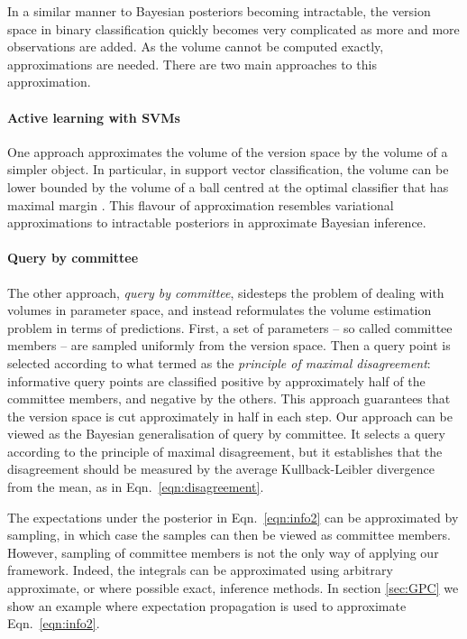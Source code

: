 \documentclass[twoside]{article}
\begin{document}
In a similar manner to Bayesian posteriors becoming intractable, the version space in
binary classification quickly becomes very complicated as more and more
observations are added. As the volume cannot be computed exactly,
approximations are needed. There are two main approaches to this approximation.

\paragraph{Active learning with SVMs} One approach \cite{TongKoller2001} approximates the volume of the version space
by the volume of a simpler object. In particular, in support vector
classification, the volume can be lower bounded by the volume of a ball
centred at the optimal classifier that has maximal margin
\cite{TongKoller2001}. This flavour of approximation resembles
variational approximations to intractable posteriors in approximate Bayesian
inference.

\paragraph{Query by committee} The other approach, \emph{query by committee}, sidesteps the problem of dealing with volumes in parameter space, and instead reformulates the volume estimation problem in terms of predictions. First, a set of parameters -- so
called committee members -- are sampled uniformly from the version space. Then a query
point is selected according to what \cite{Seung1992} termed as the \emph{principle of maximal disagreement}: informative
query points are classified positive by approximately half of the committee members,
and negative by the others. This approach guarantees that the version space is
cut approximately in half in each step. Our approach can be viewed as the
Bayesian generalisation of query by committee. It selects a query according to
the principle of maximal disagreement, but it establishes that the disagreement should be measured by the
average Kullback-Leibler divergence from the mean, as in Eqn.\  \eqref{eqn:disagreement}.


The expectations under the posterior in Eqn.\  \eqref{eqn:info2} can be
approximated by sampling, in which case the samples can then be viewed as
committee members. However, sampling of committee members is not the only way of applying our framework. Indeed, the integrals can be approximated using arbitrary approximate, or where possible exact, inference methods. In section \ref{sec:GPC} we show an example where expectation propagation is used to approximate Eqn.\  \eqref{eqn:info2}.
\end{document}
